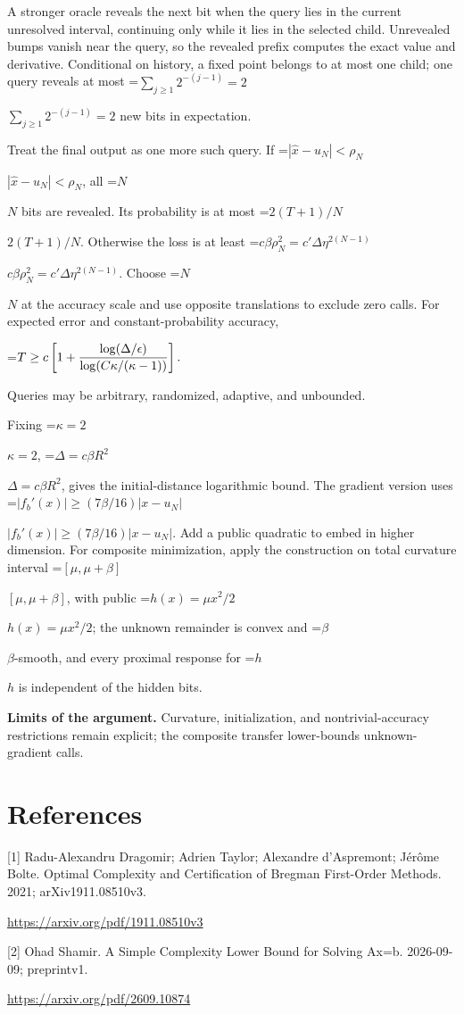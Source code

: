 \documentclass[10pt,a4paper]{article}
\newcommand{\AtlasMath}[1]{\par\begingroup\centering\setbox0=\hbox{$\displaystyle #1$}\ifdim\wd0>1.4\linewidth\typeout{ATLAS WIDE FORMULA: \the\wd0}\fi\ifdim\wd0>\linewidth\resizebox{\linewidth}{!}{\box0}\else\box0\fi\par\endgroup}
\newcommand{\AtlasInlineMath}[1]{\begingroup\setbox0=\hbox{$#1$}\ifdim\wd0>.4\linewidth\endgroup\AtlasMath{#1}\else\endgroup$#1$\fi}
\begin{document}
A stronger oracle reveals the next bit when the query lies in the current unresolved interval, continuing only while it lies in the selected child. Unrevealed bumps vanish near the query, so the revealed prefix computes the exact value and derivative. Conditional on history, a fixed point belongs to at most one child; one query reveals at most \AtlasInlineMath{\sum_{j\ge1}2^{-(j-1)}=2} new bits in expectation.

Treat the final output as one more such query. If \AtlasInlineMath{|\widehat x-u_N|<\rho_N}, all \AtlasInlineMath{N} bits are revealed. Its probability is at most \AtlasInlineMath{2(T+1)/N}. Otherwise the loss is at least
\AtlasInlineMath{c\beta\rho_N^2=c'\Delta\eta^{2(N-1)}}.
Choose \AtlasInlineMath{N} at the accuracy scale and use opposite translations to exclude zero calls. For expected error and constant-probability accuracy,

\AtlasMath{T\ge c\left[1+{\log(\Delta/\epsilon)\over
\log(C\kappa/(\kappa-1))}\right].}

Queries may be arbitrary, randomized, adaptive, and unbounded.

Fixing \AtlasInlineMath{\kappa=2}, \AtlasInlineMath{\Delta=c\beta R^2}, gives the initial-distance logarithmic bound. The gradient version uses
\AtlasInlineMath{|f_b'(x)|\ge(7\beta/16)|x-u_N|}.
Add a public quadratic to embed in higher dimension. For composite minimization, apply the construction on total curvature interval \AtlasInlineMath{[\mu,\mu+\beta]}, with public \AtlasInlineMath{h(x)=\mu x^2/2}; the unknown remainder is convex and \AtlasInlineMath{\beta}-smooth, and every proximal response for \AtlasInlineMath{h} is independent of the hidden bits.

\textbf{Limits of the argument.} Curvature, initialization, and nontrivial-accuracy restrictions remain explicit; the composite transfer lower-bounds unknown-gradient calls.

\section{References}
[1] Radu-Alexandru Dragomir; Adrien Taylor; Alexandre d’Aspremont; Jérôme Bolte. Optimal Complexity and Certification of Bregman First-Order Methods. 2021; arXiv1911.08510v3.

\url{https://arxiv.org/pdf/1911.08510v3}

[2] Ohad Shamir. A Simple Complexity Lower Bound for Solving Ax=b. 2026-09-09; preprintv1.

\url{https://arxiv.org/pdf/2609.10874}
\end{document}
